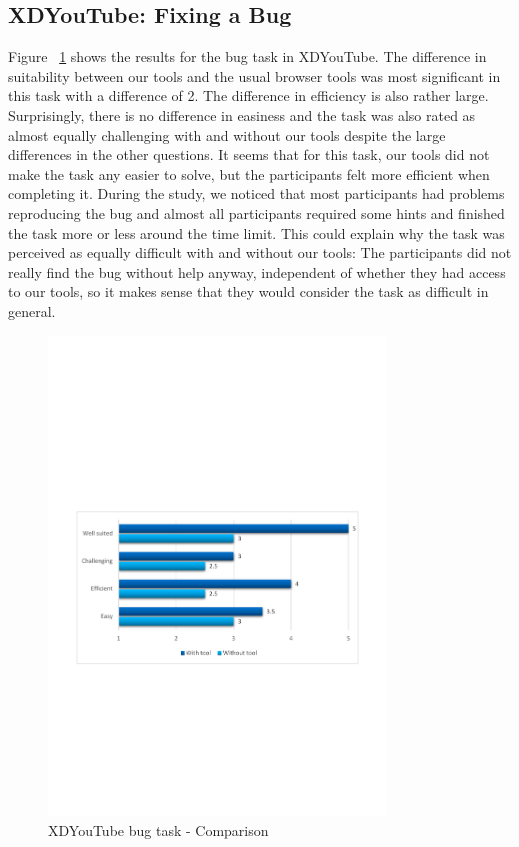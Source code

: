 \subsection{XDYouTube: Fixing a Bug}

Figure ~\ref{fig:xdyt_bug_comparison} shows the results for the bug task in XDYouTube. The difference in suitability between our tools and the usual browser tools was most significant in this task with a difference of 2. The difference in efficiency is also rather large. Surprisingly, there is no difference in easiness and the task was also rated as almost equally challenging with and without our tools despite the large differences in the other questions. It seems that for this task, our tools did not make the task any easier to solve, but the participants felt more efficient when completing it. During the study, we noticed that most participants had problems reproducing the bug and almost all participants required some hints and finished the task more or less around the time limit. This could explain why the task was perceived as equally difficult with and without our tools: The participants did not really find the bug without help anyway, independent of whether they had access to our tools, so it makes sense that they would consider the task as difficult in general. 

\begin{figure}[H]
  \centering
    \includegraphics[width=0.8\textwidth]{images/charts/xdyt_bug_comparison.pdf}
	\caption{XDYouTube bug task - Comparison}
	\label{fig:xdyt_bug_comparison}
\end{figure}

